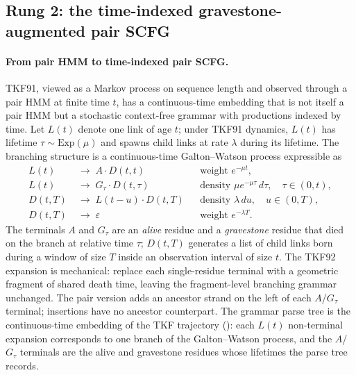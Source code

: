 \documentclass[11pt]{article}
\theoremstyle{definition}
\theoremstyle{remark}
\begin{document}
\subsection{Rung 2: the time-indexed gravestone-augmented pair SCFG}
\label{sec:rung2}


\paragraph{From pair HMM to time-indexed pair SCFG.}
TKF91, viewed as a Markov process on sequence length and observed
through a pair HMM at finite time $t$, has a continuous-time
embedding that is not itself a pair HMM but a stochastic
context-free grammar with productions indexed by time. Let
$L(t)$ denote one link of age $t$; under TKF91 dynamics, $L(t)$ has
lifetime $\tau \sim \mathrm{Exp}(\mu)$ and spawns child links at
rate $\lambda$ during its lifetime. The branching structure is a
continuous-time Galton--Watson process expressible as
\begin{align*}
L(t) &\;\to\; A \cdot D(t,t)
        & &\text{weight } e^{-\mu t}, \\
L(t) &\;\to\; G_\tau \cdot D(t,\tau)
        & &\text{density } \mu e^{-\mu \tau}\,d\tau,\quad \tau \in (0, t), \\
D(t, T) &\;\to\; L(t-u) \cdot D(t, T)
        & &\text{density } \lambda\, du,\quad u \in (0, T), \\
D(t, T) &\;\to\; \varepsilon
        & &\text{weight } e^{-\lambda T}.
\end{align*}
The terminals $A$ and $G_\tau$ are an \emph{alive} residue and a
\emph{gravestone} residue that died on the branch at relative time
$\tau$; $D(t, T)$ generates a list of child links born during a
window of size $T$ inside an observation interval of size $t$. The
TKF92 expansion is mechanical: replace each single-residue terminal
with a geometric fragment of shared death time, leaving the
fragment-level branching grammar unchanged. The pair version adds
an ancestor strand on the left of each $A$/$G_\tau$ terminal; insertions
have no ancestor counterpart. The grammar parse tree is the
continuous-time embedding of the TKF trajectory
(): each $L(t)$ non-terminal expansion
corresponds to one branch of the Galton--Watson process, and the
$A$/$G_\tau$ terminals are the alive and gravestone residues whose
lifetimes the parse tree records.
\end{document}
